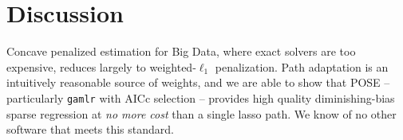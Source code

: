 \documentclass[12pt]{article}
\begin{document}
\section{Discussion}
\label{discussion}


Concave penalized estimation for Big Data, where exact solvers are too
 expensive, reduces largely to weighted-$\ell_1$ penalization.
Path adaptation is an intuitively reasonable source of weights, and we are able to show that POSE -- particularly {\tt gamlr} with AICc selection -- provides high quality diminishing-bias sparse regression at
{\it no more cost} than a  single lasso path.  We know of no other software that meets this standard.





\end{document}
